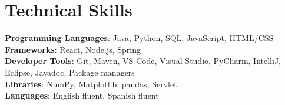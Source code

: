 \documentclass[letterpaper,11pt]{article}
\begin{document}
\section{Technical Skills}
 \begin{itemize}[leftmargin=0.15in, label={}]
    \small{\item{
     \textbf{Programming Languages}{: Java, Python, SQL, JavaScript, HTML/CSS} \\
     \textbf{Frameworks}{: React, Node.js, Spring} \\
     \textbf{Developer Tools}{: Git, Maven, VS Code, Visual Studio, PyCharm, IntelliJ, Eclipse, Javadoc, Package managers} \\
     \textbf{Libraries}{: NumPy, Matplotlib, pandas, Servlet}\\
     \textbf{Languages}{: English fluent, Spanish fluent} \\
    }}
 \end{itemize}


\end{document}
